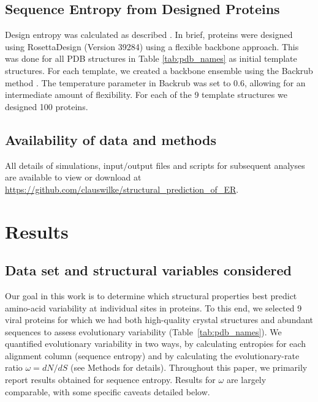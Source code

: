 \documentclass[12pt]{article}
\begin{document}
\subsection*{Sequence Entropy from Designed Proteins}

Design entropy was calculated as described \citep{Jacksonetal2013}. In brief, proteins were designed using RosettaDesign (Version 39284) \citep{LeaverFayetal2011} using a flexible backbone approach. This was done for all PDB structures in Table \ref{tab:pdb_names} as initial template structures. For each template, we created a backbone ensemble using the Backrub method \citep{Smith2008}. The temperature parameter in Backrub was set to 0.6, allowing for an intermediate amount of flexibility.  For each of the 9 template structures we designed 100 proteins.

\subsection*{Availability of data and methods}

All details of simulations, input$/$output files and scripts for subsequent analyses are available to view or download at \url{https://github.com/clauswilke/structural\_prediction\_of\_ER}.

\section*{Results}

\subsection*{Data set and structural variables considered}

Our goal in this work is to determine which structural properties best predict amino-acid variability at individual sites in proteins. To this end, we selected 9 viral proteins for which we had both high-quality crystal structures and abundant sequences to assess evolutionary variability (Table~\ref{tab:pdb_names}). We quantified evolutionary variability in two ways, by calculating entropies for each alignment column (sequence entropy) and by calculating the evolutionary-rate ratio $\omega=dN/dS$ (see Methods for details). Throughout this paper, we primarily report results obtained for sequence entropy. Results for $\omega$ are largely comparable, with some specific caveats detailed below.
\end{document}
